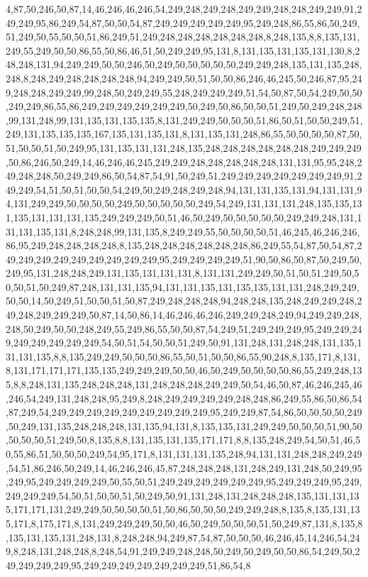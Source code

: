 4,87,50,246,50,87,14,46,246,46,246,54,249,248,249,248,249,249,248,248,249,249,91,249,249,95,86,249,54,87,50,50,54,87,249,249,249,249,249,95,249,248,86,55,86,50,249,51,249,50,55,50,50,51,86,249,51,249,248,248,248,248,248,248,8,248,135,8,8,135,131,249,55,249,50,50,86,55,50,86,46,51,50,249,249,95,131,8,131,135,131,135,131,130,8,248,248,131,94,249,249,50,50,246,50,249,50,50,50,50,50,249,249,248,135,131,135,248,248,8,248,249,248,248,248,248,94,249,249,50,51,50,50,86,246,46,245,50,246,87,95,249,248,248,249,249,99,248,50,249,249,55,248,249,249,249,51,54,50,87,50,54,249,50,50,249,249,86,55,86,249,249,249,249,249,249,50,249,50,86,50,50,51,249,50,249,248,248,99,131,248,99,131,135,131,135,135,8,131,249,249,50,50,50,51,86,50,51,50,50,249,51,249,131,135,135,135,167,135,131,135,131,8,131,135,131,248,86,55,50,50,50,50,87,50,51,50,50,51,50,249,95,131,135,131,131,248,135,248,248,248,248,248,248,249,249,249,50,86,246,50,249,14,46,246,46,245,249,249,248,248,248,248,248,131,131,95,95,248,249,248,248,50,249,249,86,50,54,87,54,91,50,249,51,249,249,249,249,249,249,249,91,249,249,54,51,50,51,50,50,54,249,50,249,248,249,248,94,131,131,135,131,94,131,131,94,131,249,249,50,50,50,50,249,50,50,50,50,50,249,54,249,131,131,131,248,135,135,131,135,131,131,131,135,249,249,249,50,51,46,50,249,50,50,50,50,50,249,249,248,131,131,131,135,131,8,248,248,99,131,135,8,249,249,55,50,50,50,50,51,46,245,46,246,246,86,95,249,248,248,248,248,8,135,248,248,248,248,248,248,86,249,55,54,87,50,54,87,249,249,249,249,249,249,249,249,249,95,249,249,249,249,51,90,50,86,50,87,50,249,50,249,95,131,248,248,249,131,135,131,131,131,8,131,131,249,249,50,51,50,51,249,50,50,50,51,50,249,87,248,131,131,135,94,131,131,135,131,135,135,131,131,248,249,249,50,50,14,50,249,51,50,50,51,50,87,249,248,248,248,94,248,248,135,248,249,249,248,249,248,249,249,249,50,87,14,50,86,14,46,246,46,246,249,249,248,249,94,249,249,248,248,50,249,50,50,248,249,55,249,86,55,50,50,87,54,249,51,249,249,249,95,249,249,249,249,249,249,249,249,54,50,51,54,50,50,51,249,50,91,131,248,131,248,248,131,135,131,131,135,8,8,135,249,249,50,50,50,86,55,50,51,50,50,86,55,90,248,8,135,171,8,131,8,131,171,171,171,135,135,249,249,249,50,50,46,50,249,50,50,50,50,86,55,249,248,135,8,8,248,131,135,248,248,248,131,248,248,248,249,249,50,54,46,50,87,46,246,245,46,246,54,249,131,248,248,95,249,8,248,249,249,249,249,248,248,86,249,55,86,50,86,54,87,249,54,249,249,249,249,249,249,249,249,249,95,249,249,87,54,86,50,50,50,50,249,50,249,131,135,248,248,248,131,135,94,131,8,135,135,131,249,249,50,50,50,51,90,50,50,50,50,51,249,50,8,135,8,8,131,135,131,135,171,171,8,8,135,248,249,54,50,51,46,50,55,86,51,50,50,50,249,54,95,171,8,131,131,131,135,248,94,131,131,248,248,249,249,54,51,86,246,50,249,14,46,246,246,45,87,248,248,248,131,248,249,131,248,50,249,95,249,95,249,249,249,249,50,55,50,51,249,249,249,249,249,249,95,249,249,249,95,249,249,249,249,54,50,51,50,50,51,50,249,50,91,131,248,131,248,248,248,135,131,131,135,171,171,131,249,249,50,50,50,50,51,50,86,50,50,50,249,249,248,8,135,8,135,131,135,171,8,175,171,8,131,249,249,249,50,50,46,50,249,50,50,50,51,50,249,87,131,8,135,8,135,131,135,131,248,131,8,248,248,94,249,87,54,87,50,50,50,46,246,45,14,246,54,249,8,248,131,248,248,8,248,54,91,249,249,248,248,50,249,50,249,50,50,86,54,249,50,249,249,249,249,95,249,249,249,249,249,249,249,51,86,54,8